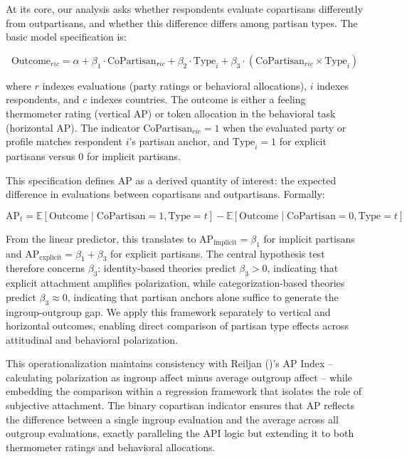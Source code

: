 \documentclass[
  12pt,
  a4paper,
  DIV=11,
  numbers=noendperiod]{scrartcl}
\begin{document}
At its core, our analysis asks whether respondents evaluate copartisans
differently from outpartisans, and whether this difference differs among
partisan types. The basic model specification is:

\[
\text{Outcome}_{ric} = \alpha + \beta_1 \cdot \text{CoPartisan}_{ric} + \beta_2 \cdot \text{Type}_i + \beta_3 \cdot (\text{CoPartisan}_{ric} \times \text{Type}_i)
\]

where \(r\) indexes evaluations (party ratings or behavioral
allocations), \(i\) indexes respondents, and \(c\) indexes countries.
The outcome is either a feeling thermometer rating (vertical AP) or
token allocation in the behavioral task (horizontal AP). The indicator
\(\text{CoPartisan}_{ric} = 1\) when the evaluated party or profile
matches respondent \(i\)'s partisan anchor, and \(\text{Type}_i = 1\)
for explicit partisans versus 0 for implicit partisans.

This specification defines AP as a derived quantity of interest: the
expected difference in evaluations between copartisans and outpartisans.
Formally:

\[
\text{AP}_t = \mathbb{E}[\text{Outcome} \mid \text{CoPartisan}=1, \text{Type}=t] - \mathbb{E}[\text{Outcome} \mid \text{CoPartisan}=0, \text{Type}=t]
\]

From the linear predictor, this translates to
\(\text{AP}_{\text{implicit}} = \beta_1\) for implicit partisans and
\(\text{AP}_{\text{explicit}} = \beta_1 + \beta_3\) for explicit
partisans. The central hypothesis test therefore concerns \(\beta_3\):
identity-based theories predict \(\beta_3 > 0\), indicating that
explicit attachment amplifies polarization, while categorization-based
theories predict \(\beta_3 \approx 0\), indicating that partisan anchors
alone suffice to generate the ingroup-outgroup gap. We apply this
framework separately to vertical and horizontal outcomes, enabling
direct comparison of partisan type effects across attitudinal and
behavioral polarization.

This operationalization maintains consistency with Reiljan
()'s AP Index -- calculating
polarization as ingroup affect minus average outgroup affect -- while
embedding the comparison within a regression framework that isolates the
role of subjective attachment. The binary copartisan indicator ensures
that AP reflects the difference between a single ingroup evaluation and
the average across all outgroup evaluations, exactly paralleling the API
logic but extending it to both thermometer ratings and behavioral
allocations.
\end{document}

